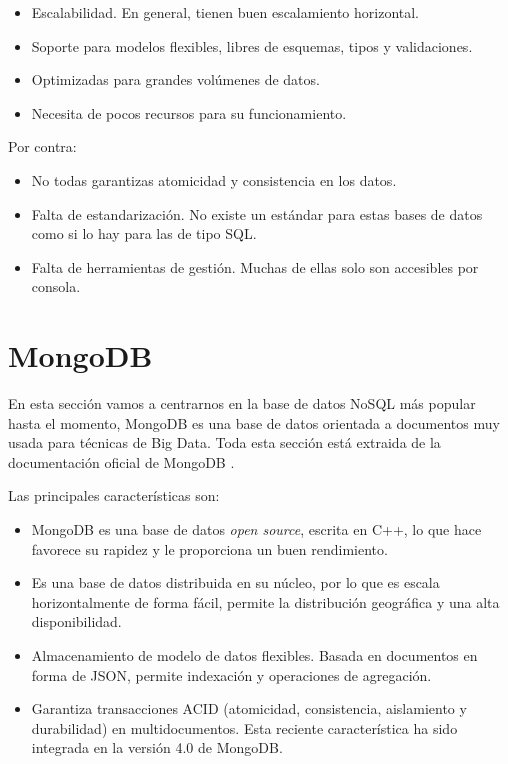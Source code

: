 \begin{itemize}
    \item Escalabilidad. En general, tienen buen escalamiento horizontal.
    \item Soporte para modelos flexibles, libres de esquemas, tipos y validaciones.
    \item Optimizadas para grandes volúmenes de datos.
    \item Necesita de pocos recursos para su funcionamiento.
\end{itemize}

Por contra:

\begin{itemize}
    \item No todas garantizas atomicidad y consistencia en los datos.
    \item Falta de estandarización. No existe un estándar para estas bases de datos como si lo hay para las de tipo SQL.
    \item Falta de herramientas de gestión. Muchas de ellas solo son accesibles por consola.
\end{itemize}

\section{MongoDB}

En esta sección vamos a centrarnos en la base de datos NoSQL más popular hasta el momento, MongoDB es una base de datos orientada a documentos muy usada para técnicas de Big Data. Toda esta sección está extraida de la documentación oficial de MongoDB \cite{mongodb}.

Las principales características son:

\begin{itemize}
    \item MongoDB es una base de datos \textit{open source}, escrita en C++, lo que hace favorece su rapidez y le proporciona un buen rendimiento.
    \item Es una base de datos distribuida en su núcleo, por lo que es escala horizontalmente de forma fácil, permite la distribución geográfica y una alta disponibilidad.
    \item Almacenamiento de modelo de datos flexibles. Basada en documentos en forma de JSON, permite indexación y operaciones de agregación.
    \item Garantiza transacciones ACID (atomicidad, consistencia, aislamiento y durabilidad) en multidocumentos. Esta reciente característica ha sido integrada en la versión 4.0 de MongoDB.
\end{itemize}

